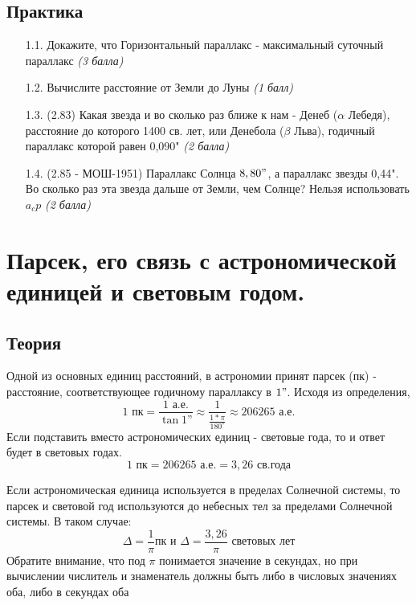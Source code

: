 \documentclass[16pt,a4paper]{report}
\begin{document}
\subsection{Практика}
\begin{enumerate}
    \item [1.1.]Докажите, что Горизонтальный параллакс - максимальный суточный параллакс \emph{(3 балла)}
    \item [1.2.]Вычислите расстояние от Земли до Луны \emph{(1 балл)}
    \item [1.3.] (2.83) Какая звезда и во сколько раз ближе к нам - Денеб ($\alpha$ Лебедя), расстояние до которого 1400 св. лет, или Денебола ($\beta$ Льва), годичный параллакс которой равен 0,090" \emph{(2 балла)}
    \item [1.4.] (2.85 - МОШ-1951) Параллакс Солнца $8,80"$, а параллакс звезды 0,44". Во сколько раз эта звезда дальше от Земли, чем Солнце? Нельзя использовать $a_cp$ \emph{(2 балла)}
\end{enumerate}

\section{Парсек, его связь с астрономической единицей и световым годом.}
\subsection{Теория}
Одной из основных единиц расстояний, в астрономии принят парсек (пк) - расстояние, соответствующее годичному параллаксу в $1"$. Исходя из определения, $$1 \textrm{ пк} = \frac{1 \textrm{ а.е.}}{\tan{1\textrm{''}}} \approx \frac{1}{\frac{1 * \pi}{180^{\circ}}} \approx 206265 \textrm{ а.е.}$$
Если подставить вместо астрономических единиц - световые года, то и ответ будет в световых годах.
$$1 \textrm{ пк} = 206265 \textrm{ а.е.} = 3,26 \textrm{ св.года}$$

Если астрономическая единица используется в пределах Солнечной системы, то парсек и световой год используются до небесных тел за пределами Солнечной системы. В таком случае:
$$\Delta = \frac{1}{\pi} \textrm{пк и } \Delta = \frac{3,26}{\pi}\textrm{ световых лет}  $$
Обратите внимание, что под $\pi$ понимается значение в секундах, но при вычислении числитель и знаменатель должны быть либо в числовых значениях оба, либо в секундах оба
\end{document}
